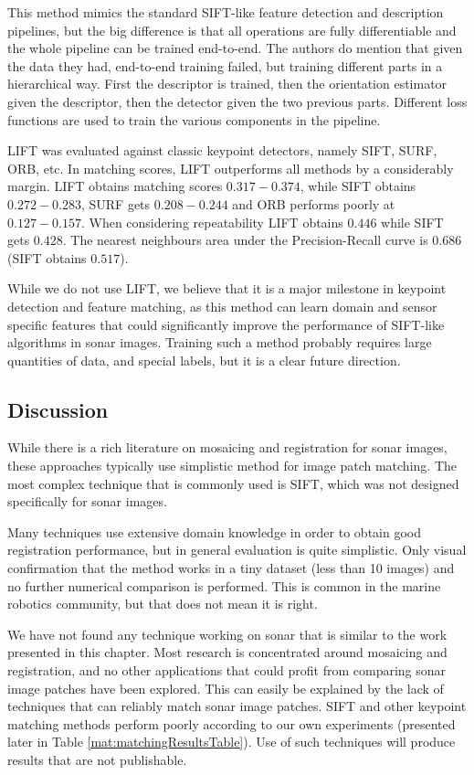 This method mimics the standard SIFT-like feature detection and description pipelines, but the big difference is that all operations are fully differentiable and the whole pipeline can be trained end-to-end. The authors do mention that given the data they had, end-to-end training failed, but training different parts in a hierarchical way. First the descriptor is trained, then the orientation estimator given the descriptor, then the detector given the two previous parts. Different loss functions are used to train the various components in the pipeline.

LIFT was evaluated against classic keypoint detectors, namely SIFT, SURF, ORB, etc. In matching scores, LIFT outperforms all methods by a considerably margin. LIFT obtains matching scores $0.317-0.374$, while SIFT obtains $0.272-0.283$, SURF gets $0.208-0.244$ and ORB performs poorly at $0.127-0.157$. When considering repeatability LIFT obtains $0.446$ while SIFT gets $0.428$. The nearest neighbours area under the Precision-Recall curve is $0.686$ (SIFT obtains $0.517$).

While we do not use LIFT, we believe that it is a major milestone in keypoint detection and feature matching, as this method can learn domain and sensor specific features that could significantly improve the performance of SIFT-like algorithms in sonar images. Training such a method probably requires large quantities of data, and special labels, but it is a clear future direction.

\subsection{Discussion}

While there is a rich literature on mosaicing and registration for sonar images, these approaches typically use simplistic method for image patch matching. The most complex technique that is commonly used is SIFT, which was not designed specifically for sonar images.

Many techniques use extensive domain knowledge in order to obtain good registration performance, but in general evaluation is quite simplistic. Only visual confirmation that the method works in a tiny dataset (less than 10 images) and no further numerical comparison is performed. This is common in the marine robotics community, but that does not mean it is right.

We have not found any technique working on sonar that is similar to the work presented in this chapter. Most research is concentrated around mosaicing and registration, and no other applications that could profit from comparing sonar image patches have been explored. This can easily be explained by the lack of techniques that can reliably match sonar image patches. SIFT and other keypoint matching methods perform poorly according to our own experiments (presented later in Table \ref{mat:matchingResultsTable}). Use of such techniques will produce results that are not publishable.

